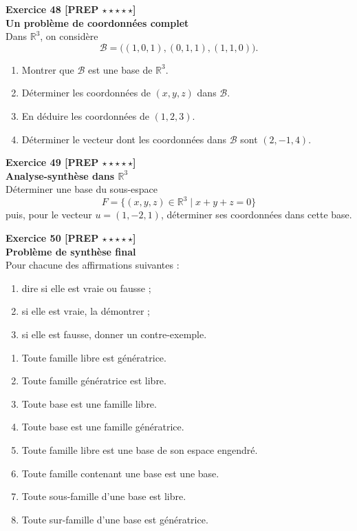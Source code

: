 \documentclass[11pt,a4paper]{article}
\begin{document}
\textbf{Exercice 48 [PREP $\star\star\star\star\star$]}\\
\textbf{Un problème de coordonnées complet}\\
Dans \(\mathbb{R}^3\), on considère
\[
\mathcal B=\big((1,0,1),(0,1,1),(1,1,0)\big).
\]
\begin{enumerate}[label=\alph*)]
    \item Montrer que \(\mathcal B\) est une base de \(\mathbb{R}^3\).
    \item Déterminer les coordonnées de \((x,y,z)\) dans \(\mathcal B\).
    \item En déduire les coordonnées de \((1,2,3)\).
    \item Déterminer le vecteur dont les coordonnées dans \(\mathcal B\) sont \((2,-1,4)\).
\end{enumerate}

\textbf{Exercice 49 [PREP $\star\star\star\star\star$]}\\
\textbf{Analyse-synthèse dans \(\mathbb{R}^3\)}\\
Déterminer une base du sous-espace
\[
F=\{(x,y,z)\in\mathbb{R}^3\mid x+y+z=0\}
\]
puis, pour le vecteur \(u=(1,-2,1)\), déterminer ses coordonnées dans cette base.

\textbf{Exercice 50 [PREP $\star\star\star\star\star$]}\\
\textbf{Problème de synthèse final}\\
Pour chacune des affirmations suivantes :
\begin{enumerate}[label=\alph*)]
    \item dire si elle est vraie ou fausse ;
    \item si elle est vraie, la démontrer ;
    \item si elle est fausse, donner un contre-exemple.
\end{enumerate}

\begin{enumerate}[label=\arabic*)]
    \item Toute famille libre est génératrice.
    \item Toute famille génératrice est libre.
    \item Toute base est une famille libre.
    \item Toute base est une famille génératrice.
    \item Toute famille libre est une base de son espace engendré.
    \item Toute famille contenant une base est une base.
    \item Toute sous-famille d’une base est libre.
    \item Toute sur-famille d’une base est génératrice.
\end{enumerate}
\end{document}
